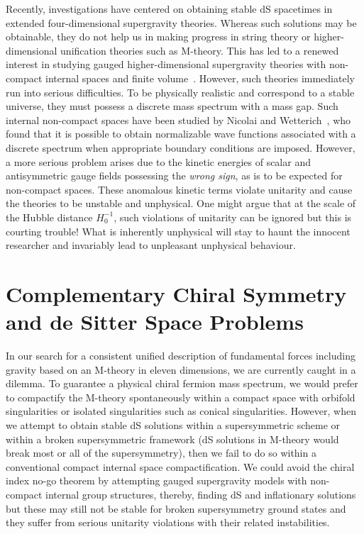 \documentclass[a4paper,12pt]{article}
\begin{document}
Recently, investigations have centered on obtaining stable dS spacetimes in
extended four-dimensional supergravity theories. Whereas such solutions may
be obtainable, they do not help us in making progress in string theory or
higher-dimensional unification theories such as M-theory. This has led to a
renewed interest in studying gauged higher-dimensional supergravity
theories with non-compact internal spaces and finite
volume~\cite{Hull}. However, such theories immediately run into
serious difficulties. To be physically realistic and correspond
to a stable universe, they must possess a discrete mass spectrum
with a mass gap. Such internal non-compact spaces have been
studied by Nicolai and Wetterich~\cite{Nicolai}, who found that
it is possible to obtain normalizable wave functions associated
with a discrete spectrum when appropriate boundary conditions
are imposed. However, a more serious problem arises due to the
kinetic energies of scalar and antisymmetric gauge fields
possessing the {\it wrong sign}, as is to be expected for
non-compact spaces. These anomalous kinetic terms violate
unitarity and cause the theories to be unstable and unphysical.
One might argue that at the scale of the Hubble distance
$H_0^{-1}$, such violations of unitarity can be ignored but this
is courting trouble! What is inherently unphysical will stay to
haunt the innocent researcher and invariably lead to unpleasant
unphysical behaviour.

\section{\bf Complementary Chiral Symmetry and de Sitter Space Problems}

In our search for a consistent unified description of fundamental forces
including gravity based on an M-theory in eleven dimensions, we are
currently caught in a dilemma. To guarantee a physical chiral
fermion mass spectrum, we would prefer to compactify the M-theory
spontaneously within a compact space with orbifold singularities or
isolated singularities such as conical singularities. However, when we
attempt to obtain stable dS solutions within a supersymmetric
scheme or within a broken supersymmetric framework (dS solutions
in M-theory would break most or all of the supersymmetry), then
we fail to do so within a conventional compact internal space
compactification. We could avoid the chiral index no-go theorem
by attempting gauged supergravity models with non-compact
internal group structures, thereby, finding dS and
inflationary solutions but these may still not be stable for
broken supersymmetry ground states and they suffer from serious
unitarity violations with their related instabilities.
\end{document}

